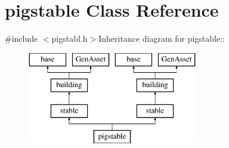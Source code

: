 \hypertarget{classpigstable}{
\section{pigstable Class Reference}
\label{classpigstable}
}


{\ttfamily \#include $<$pigstabl.h$>$}Inheritance diagram for pigstable::\begin{figure}[H]
\begin{center}
\leavevmode
\includegraphics[height=4cm]{classpigstable}
\end{center}
\end{figure}
